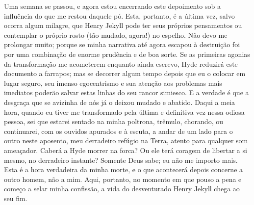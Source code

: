 Uma semana se passou, e agora estou encerrando este depoimento sob a
influência do que me restou daquele pó.  Esta, portanto, é a última
vez, salvo ocorra algum milagre, que Henry Jekyll pode ter seus
próprios pensamentos ou contemplar o próprio rosto (tão mudado, agora!)
no espelho.  Não devo me prolongar muito; porque se minha narrativa até
agora escapou à destruição foi por uma combinação de enorme prudência e
de boa sorte.  Se as primeiras agonias da transformação me acometerem
enquanto ainda escrevo, Hyde reduzirá este documento a farrapos; mas se
decorrer algum tempo depois que eu o colocar em lugar seguro, seu
imenso egocentrismo e sua atenção aos problemas mais imediatos poderão
salvar estas linhas do seu rancor simiesco.  E a verdade é que a
desgraça que se avizinha de nós já o deixou mudado e abatido.  Daqui a
meia hora, quando eu tiver me transformado pela última e definitiva vez
nessa odiosa pessoa, sei que estarei sentado na minha poltrona,
trêmulo, chorando, ou continuarei, com os ouvidos apurados e à escuta,
a andar de um lado para o outro neste aposento, meu derradeiro refúgio
na Terra, atento para qualquer som ameaçador.  Caberá a Hyde morrer na
forca? Ou ele terá coragem de libertar a si mesmo, no derradeiro
instante?  Somente Deus sabe; eu não me importo mais.  Esta é a hora
verdadeira da minha morte, e o que acontecerá depois concerne a outro
homem, não a mim. Aqui, portanto, no momento em que pouso a pena e
começo a selar minha confissão, a vida do desventurado Henry Jekyll
chega ao seu fim.  

